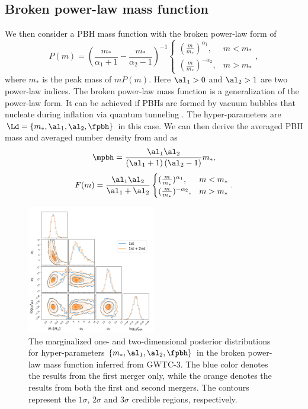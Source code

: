 \documentclass[
reprint,           %
superscriptaddress,%
amsmath,           %
amssymb,           %
aps,               %
prd,               %
notitlepage,       %
longbibliography,  %
floatfix,          %
nofootinbib,
]{revtex4-1}
\def\({\left(}
\def\){\right)}
\def\e{\begin{equation}}
\def\q{\end{equation}}
\begin{document}
\subsection{Broken power-law mass function}
We then consider a PBH mass function with the broken power-law form \cite{Deng:2021ezy} of
\begin{equation}
	P(m)= \left(\frac{m_*}{\alpha_1+1}-\frac{m_*}{\alpha_2-1}\right)^{-1} \begin{cases} (\frac{m}{m_*})^{\alpha_1}, & m<m_* \\ (\frac{m}{m_*})^{-\alpha_2}, & m>m_*\end{cases},
\end{equation}
where $m_*$ is the peak mass of $m P(m)$. Here $\al_1>0$ and $\al_2>1$ are two power-law indices. The broken power-law mass function is a generalization of the power-law form. It can be achieved if PBHs are formed by vacuum bubbles that nucleate during inflation via quantum tunneling \cite{Deng:2021ezy}.
The hyper-parameters are $\Ld = \{m_*, \al_1, \al_2, \fpbh\}$ in this case. 
We can then derive the averaged PBH mass and averaged number density from  and  as
\e
\mpbh = \frac{\al_1 \al_2}{\(\al_1 +1\)\(\al_2 -1\)} m_*,
\q
\e 
F(m) = \frac{\al_1 \al_2}{\al_1 + \al_2} \begin{cases} (\frac{m}{m_*})^{\alpha_1}, & m<m_* \\ (\frac{m}{m_*})^{-\alpha_2}, & m>m_*\end{cases}.
\q

\begin{figure}[tbp!]
	\centering
	\includegraphics[width=0.5\textwidth]{post-bpower.pdf}
	\caption{\label{posterior-bpower}The marginalized one- and two-dimensional posterior distributions for hyper-parameters $\{m_*, \al_1, \al_2, \fpbh\}$ in the broken power-law mass function inferred from GWTC-3. The blue color denotes the results from the first merger only, while the orange denotes the results from both the first and second mergers. The contours represent the $1\sigma$, $2\sigma$ and $3\sigma$ credible regions, respectively.}
\end{figure}
\end{document}
